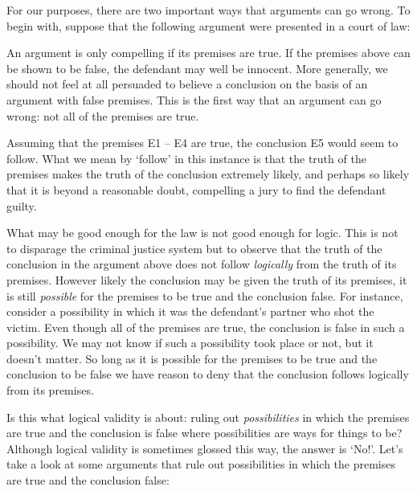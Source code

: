 For our purposes, there are two important ways that arguments can go wrong.
To begin with, suppose that the following argument were presented in a court of law:

\begin{earg}
\end{earg}

An argument is only compelling if its premises are true.
If the premises above can be shown to be false, the defendant may well be innocent.
More generally, we should not feel at all persuaded to believe a conclusion on the basis of an argument with false premises. 
This is the first way that an argument can go wrong: not all of the premises are true.

Assuming that the premises E1 -- E4 are true, the conclusion E5 would seem to follow.
What we mean by `follow' in this instance is that the truth of the premises makes the truth of the conclusion extremely likely, and perhaps so likely that it is beyond a reasonable doubt, compelling a jury to find the defendant guilty.

What may be good enough for the law is not good enough for logic.
This is not to disparage the criminal justice system but to observe that the truth of the conclusion in the argument above does not follow \textit{logically} from the truth of its premises.
However likely the conclusion may be given the truth of its premises, it is still \textit{possible} for the premises to be true and the conclusion false.
For instance, consider a possibility in which it was the defendant's partner who shot the victim.
Even though all of the premises are true, the conclusion is false in such a possibility.
We may not know if such a possibility took place or not, but it doesn't matter.
So long as it is possible for the premises to be true and the conclusion to be false we have reason to deny that the conclusion follows logically from its premises.

Is this what logical validity is about: ruling out \textit{possibilities} in which the premises are true and the conclusion is false where possibilities are ways for things to be?
Although logical validity is sometimes glossed this way, the answer is `No!'.
Let's take a look at some arguments that rule out possibilities in which the premises are true and the conclusion false:

